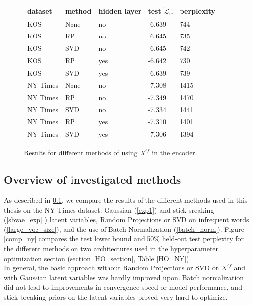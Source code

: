 \documentclass{report}
\begin{document}
	\begin{figure}
		\centering
		\begin{tabular}{l|l|l|l|l}
			dataset & method & hidden layer & test $\tilde{\mathcal{L}}_w$ & perplexity \\ \hline
			KOS	&	None	& no &	\color{red} -6.639	&	744 \\
			KOS	&	RP	&	no &-6.645	&	735 \\
			KOS&SVD&no &-6.645&742 \\
			KOS	&	RP	&	yes & -6.642	&	\color{red}730 \\
			KOS&SVD&yes &\color{red}-6.639&739 \\ \hline 
			NY Times&None&no & -7.308 & 1415\\
			NY Times&RP&no &-7.349&1470 \\
			NY Times&SVD&no &-7.334&1441 \\ 
			NY Times&RP&yes &-7.310&1401 \\
			NY Times&SVD&yes &\color{red}-7.306&\color{red}1394 \\
		\end{tabular}
		\caption{Results for different methods of using $X^{if}$ in the encoder.}
		\label{rpsvd_results}
	\end{figure}

	\subsection{Overview of investigated methods}\label{comp_methods_details}
	As described in \ref{comp_methods_details}, we compare the results of the different methods used in this thesis on the NY Times dataset: Gaussian (\ref{exp1}) and stick-sreaking (\ref{sbvae_exp} ) latent variables, Random Projections or SVD on infrequent words (\ref{large_voc_size}), and the use of Batch Normalization (\ref{batch_norm}). Figure \ref{comp_ny} compares the test lower bound and 50\% held-out test perplexity for the different methods on two architectures used in the hyperparameter optimization section (section \ref{HO_section}, Table \ref{HO_NY}).\\
	In general, the basic approach without Random Projections or SVD on $X^{if}$ and with Gaussian latent variables was hardly improved upon. Batch normalization did not lead to improvements in convergence speed or model performance, and stick-breaking priors on the latent variables proved very hard to optimize.
	
\end{document}
